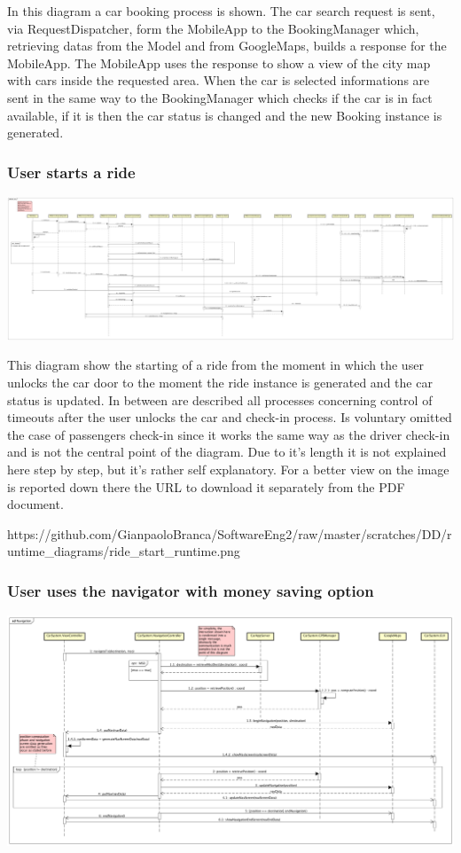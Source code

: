 \documentclass[]{article}
\begin{document}
In this diagram a car booking process is shown. The car search request
is sent, via RequestDispatcher, form the MobileApp to the BookingManager
which, retrieving datas from the Model and from GoogleMaps, builds a
response for the MobileApp. The MobileApp uses the response to show a
view of the city map with cars inside the requested area. When the car
is selected informations are sent in the same way to the BookingManager
which checks if the car is in fact available, if it is then the car
status is changed and the new Booking instance is generated.

\subsubsection{User starts a ride}\label{user-starts-a-ride}

\centerline{\includegraphics{./runtime_diagrams/ride_start_runtime.png}}

This diagram show the starting of a ride from the moment in which the
user unlocks the car door to the moment the ride instance is generated
and the car status is updated. In between are described all processes
concerning control of timeouts after the user unlocks the car and
check-in process. Is voluntary omitted the case of passengers check-in
since it works the same way as the driver check-in and is not the
central point of the diagram. Due to it's length it is not explained
here step by step, but it's rather self explanatory. For a better view
on the image is reported down there the URL to download it separately
from the PDF document.

https://github.com/GianpaoloBranca/SoftwareEng2/raw/master/scratches/DD/runtime\_diagrams/ride\_start\_runtime.png

\subsubsection{User uses the navigator with money saving
option}\label{user-uses-the-navigator-with-money-saving-option}

\centerline{\includegraphics{./runtime_diagrams/navigation_runtime.png}}
\end{document}

